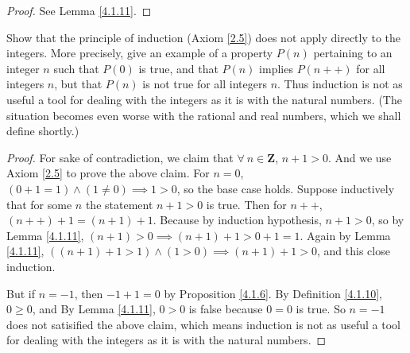 \begin{proof}
    See Lemma \ref{4.1.11}.
\end{proof}

\begin{exercise}\label{ex 4.1.8}
    Show that the principle of induction (Axiom \ref{2.5}) does not apply directly to the integers.
    More precisely, give an example of a property \(P(n)\) pertaining to an integer \(n\) such that \(P(0)\) is true, and that \(P(n)\) implies \(P(n++)\) for all integers \(n\), but that \(P(n)\) is not true for all integers \(n\).
    Thus induction is not as useful a tool for dealing with the integers as it is with the natural numbers.
    (The situation becomes even worse with the rational and real numbers, which we shall define shortly.)
\end{exercise}

\begin{proof}
    For sake of contradiction, we claim that \(\forall\ n \in \mathbf{Z}\), \(n + 1 > 0\).
    And we use Axiom \ref{2.5} to prove the above claim.
    For \(n = 0\), \((0 + 1 = 1) \land (1 \neq 0) \implies 1 > 0\), so the base case holds.
    Suppose inductively that for some \(n\) the statement \(n + 1 > 0\) is true.
    Then for \(n++\), \((n++) + 1 = (n + 1) + 1\).
    Because by induction hypothesis, \(n + 1 > 0\), so by Lemma \ref{4.1.11}, \((n + 1) > 0 \implies (n + 1) + 1 > 0 + 1 = 1\).
    Again by Lemma \ref{4.1.11}, \(((n + 1) + 1 > 1) \land (1 > 0) \implies (n + 1) + 1 > 0\), and this close induction.

    But if \(n = -1\), then \(-1 + 1 = 0\) by Proposition \ref{4.1.6}.
    By Definition \ref{4.1.10}, \(0 \geq 0\), and By Lemma \ref{4.1.11}, \(0 > 0\) is false because \(0 = 0\) is true.
    So \(n = -1\) does not satisified the above claim, which means induction is not as useful a tool for dealing with the integers as it is with the natural numbers.
\end{proof}